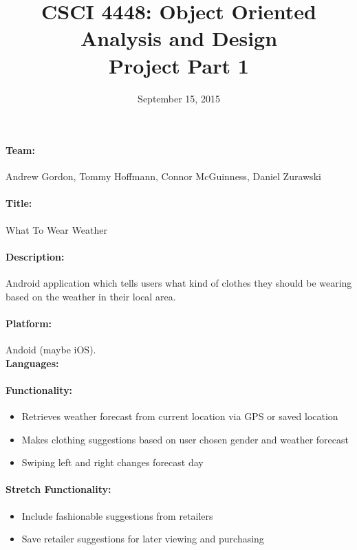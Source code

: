\documentclass[12pt,a4paper]{article}
\begin{document}
\title{CSCI 4448: Object Oriented Analysis and Design\\ Project Part 1}
\date{September 15, 2015}        
\maketitle

\paragraph{Team:}Andrew Gordon, Tommy Hoffmann, Connor McGuinness, Daniel Zurawski

\paragraph{Title:}What To Wear Weather

\paragraph{Description:}Android application which tells users what kind
of clothes they should be wearing based on the weather in their local area.

\paragraph{Platform:}Andoid (maybe iOS). \\



\noindent\textbf{Languages:} 
\begin{table}[!htpd]
\end{table}

\paragraph{Functionality: }
\begin{itemize}

\item Retrieves weather forecast from current location via GPS or saved location
\item Makes clothing suggestions based on user chosen gender and weather forecast
\item Swiping left and right changes forecast day
\end{itemize}

\paragraph{Stretch Functionality: }
\begin{itemize}
\item Include fashionable suggestions from retailers
\item Save retailer suggestions for later viewing and purchasing
\end{itemize}
\end{document}
